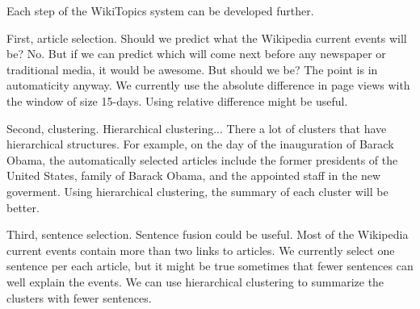 \documentclass[11pt]{article}
\begin{document}
Each step of the WikiTopics system can be developed further.

First, article selection.
Should we predict what the Wikipedia current events will be?
No.
But if we can predict which will come next before any newspaper or traditional media, it would be awesome.
But should we be? The point is in automaticity anyway.
We currently use the absolute difference in page views with the window of size 15-days.
Using relative difference might be useful.

Second, clustering.
Hierarchical clustering... There a lot of clusters that have hierarchical structures. For example, on the day of the
inauguration of Barack Obama, the automatically selected articles include
the former presidents of the United States, family of Barack Obama,
and the appointed staff in the new goverment.
Using hierarchical clustering, the summary of each cluster will be better.

Third, sentence selection. Sentence fusion could be useful. Most of the Wikipedia current events 
contain more than two links to articles. We currently select one sentence per each article,
but it might be true sometimes that fewer sentences can well explain the events.
We can use hierarchical clustering to summarize the clusters with fewer sentences.






\end{document}
